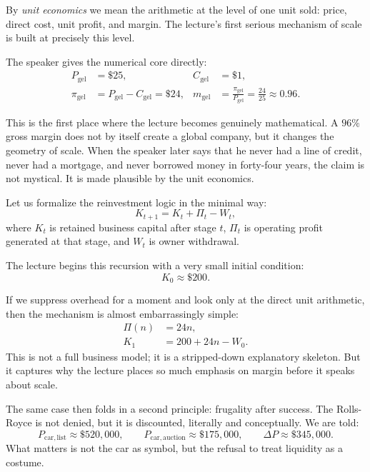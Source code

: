 \begin{definition}
By \emph{unit economics} we mean the arithmetic at the level of one unit sold: price, direct cost, unit profit, and margin. The lecture's first serious mechanism of scale is built at precisely this level.
\end{definition}

The speaker gives the numerical core directly:
\begin{align}
P_{\mathrm{gel}} &= \$25, &
C_{\mathrm{gel}} &= \$1, \\
\pi_{\mathrm{gel}} &= P_{\mathrm{gel}}-C_{\mathrm{gel}}=\$24, &
m_{\mathrm{gel}} &= \frac{\pi_{\mathrm{gel}}}{P_{\mathrm{gel}}}=\frac{24}{25}\approx 0.96 .
\end{align}

This is the first place where the lecture becomes genuinely mathematical. A \(96\%\) gross margin does not by itself create a global company, but it changes the geometry of scale. When the speaker later says that he never had a line of credit, never had a mortgage, and never borrowed money in forty-four years, the claim is not mystical. It is made plausible by the unit economics.

Let us formalize the reinvestment logic in the minimal way:
\begin{equation}
K_{t+1}=K_t+\Pi_t-W_t ,
\end{equation}
where \(K_t\) is retained business capital after stage \(t\), \(\Pi_t\) is operating profit generated at that stage, and \(W_t\) is owner withdrawal.

The lecture begins this recursion with a very small initial condition:
\begin{equation}
K_0 \approx \$200 .
\end{equation}

If we suppress overhead for a moment and look only at the direct unit arithmetic, then the mechanism is almost embarrassingly simple:
\begin{align}
\Pi(n) &= 24n, \\
K_1 &= 200 + 24n - W_0 .
\end{align}
This is not a full business model; it is a stripped-down explanatory skeleton. But it captures why the lecture places so much emphasis on margin before it speaks about scale.

The same case then folds in a second principle: frugality after success. The Rolls-Royce is not denied, but it is discounted, literally and conceptually. We are told:
\begin{equation}
P_{\mathrm{car,list}} \approx \$520{,}000, \qquad
P_{\mathrm{car,auction}} \approx \$175{,}000, \qquad
\Delta P \approx \$345{,}000 .
\end{equation}
What matters is not the car as symbol, but the refusal to treat liquidity as a costume.

